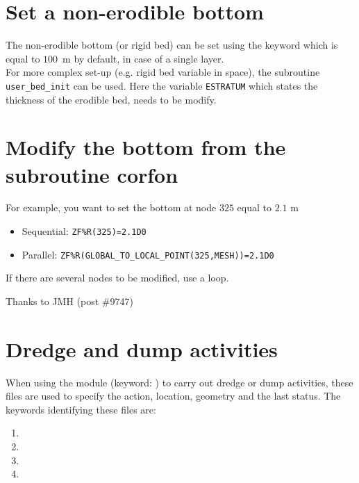 \section{Set a non-erodible bottom}
The non-erodible bottom (or rigid bed) can be set using the keyword  which is equal to $100$~m by default, in case of a single layer. \\
For more complex set-up (e.g. rigid bed variable in space), the subroutine \texttt{user\_bed\_init} can be used. Here the variable \texttt{ESTRATUM} which states the thickness of the erodible bed, needs to be modify.
\section{Modify the bottom from the subroutine corfon}
For example, you want to set the bottom at node $325$ equal to $2.1$ m
\begin{itemize}
\item Sequential: \texttt{ZF\%R(325)=2.1D0}
\item Parallel: \texttt{ZF\%R(GLOBAL\_TO\_LOCAL\_POINT(325,MESH))=2.1D0}
\end{itemize}

If there are several nodes to be modified, use a loop.

{\footnotesize Thanks to JMH (post \#9747)}

\section{Dredge and dump activities}
When using the module \nestor (keyword: ) to carry out dredge or dump activities, these files are used to
specify the action, location, geometry and the last status. The keywords identifying these files are:

\begin{enumerate}
\item  {}

\item  {}

\item  {}

\item  {}
\end{enumerate}

